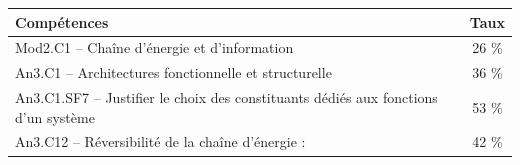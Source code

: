 \footnotesize 
\begin{center} 
\begin{tabular}{|p{.7\linewidth}|c|} 
\hline 
Compétences  & Taux \\ \hline \hline 
Mod2.C1 -- Chaîne d’énergie et d'information&26 \% \\ \hline 
An3.C1 -- Architectures fonctionnelle et structurelle &36 \% \\ \hline 
An3.C1.SF7 -- Justifier le choix des constituants dédiés aux fonctions d’un système&53 \% \\ \hline 
An3.C12 -- Réversibilité de la chaîne d’énergie :&42 \% \\ \hline 
\end{tabular} 
\end{center} 
\normalsize 
 
